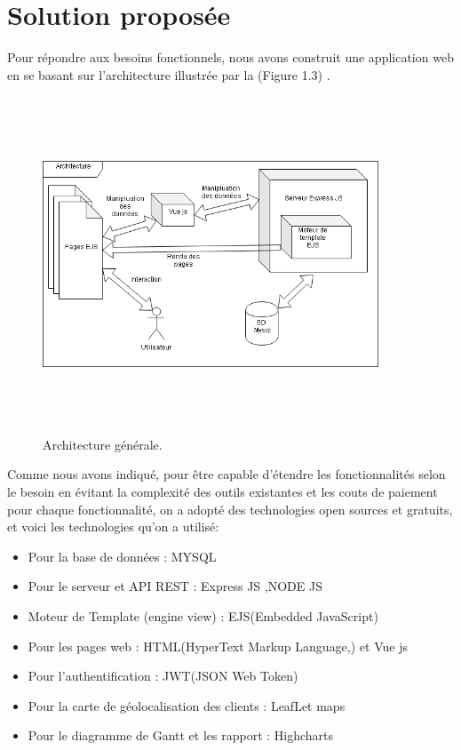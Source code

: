 \section{ Solution propos\'{e}e  }
Pour r\'{e}pondre aux besoins fonctionnels, nous avons construit une application web en
se basant sur l’architecture illustr\'{e}e par la (Figure 1.3) .


\begin{figure}
\center
\includegraphics[width=10cm,height=10cm]{./figures/archi.png}
\caption{Architecture g\'{e}n\'{e}rale.}
\end{figure}

Comme nous avons indiqu\'{e}, pour \^{e}tre capable d'\'{e}tendre les fonctionnalit\'{e}s
selon le besoin en \'{e}vitant la complexit\'{e} des outils existantes et les couts de
paiement pour chaque fonctionnalit\'{e}, on a adopt\'{e} des technologies open
sources et gratuits, et voici les technologies qu'on a utilis\'{e}:

\begin{itemize}

\item{Pour la base de donn\'{e}es : MYSQL}
\item{Pour le serveur et API REST : Express JS ,NODE JS}
\item{Moteur de Template (engine view) : EJS(Embedded JavaScript) }
\item{Pour les pages web : HTML(HyperText Markup Language,) et Vue js}
\item{Pour l'authentification : JWT(JSON Web Token) }
\item{Pour la carte de g\'{e}olocalisation des clients : LeafLet maps}
\item{Pour le diagramme de Gantt et les rapport : Highcharts}

\end{itemize}


